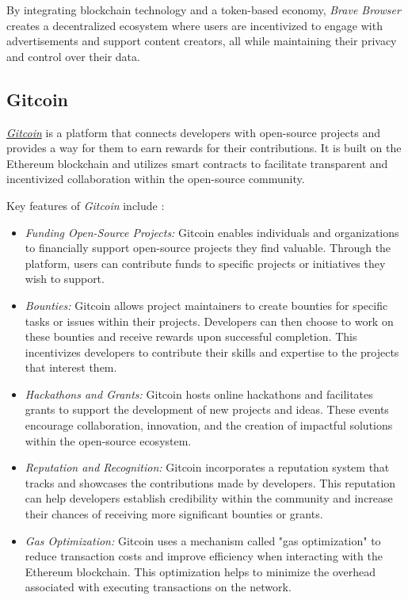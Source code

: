 By integrating blockchain technology and a token-based economy, \textit{Brave Browser} creates a decentralized ecosystem where users are incentivized to engage with advertisements and support content creators, all while maintaining their privacy and control over their data.\newline

\subsection{Gitcoin}

\href{https://www.gitcoin.co}{\textit{Gitcoin}} is a platform that connects developers with open-source projects and provides a way for them to earn rewards for their contributions. It is built on the Ethereum blockchain and utilizes smart contracts to facilitate transparent and incentivized collaboration within the open-source community.\newline

Key features of \textit{Gitcoin} include \cite{gitcoin}:

\begin{itemize}
    \item \textit{Funding Open-Source Projects:} Gitcoin enables individuals and organizations to financially support open-source projects they find valuable. Through the platform, users can contribute funds to specific projects or initiatives they wish to support.
    \item \textit{Bounties:} Gitcoin allows project maintainers to create bounties for specific tasks or issues within their projects. Developers can then choose to work on these bounties and receive rewards upon successful completion. This incentivizes developers to contribute their skills and expertise to the projects that interest them.
    \item \textit{Hackathons and Grants:} Gitcoin hosts online hackathons and facilitates grants to support the development of new projects and ideas. These events encourage collaboration, innovation, and the creation of impactful solutions within the open-source ecosystem.
    \item \textit{Reputation and Recognition:} Gitcoin incorporates a reputation system that tracks and showcases the contributions made by developers. This reputation can help developers establish credibility within the community and increase their chances of receiving more significant bounties or grants.
    \item \textit{Gas Optimization:} Gitcoin uses a mechanism called "gas optimization" to reduce transaction costs and improve efficiency when interacting with the Ethereum blockchain. This optimization helps to minimize the overhead associated with executing transactions on the network.
\end{itemize}

